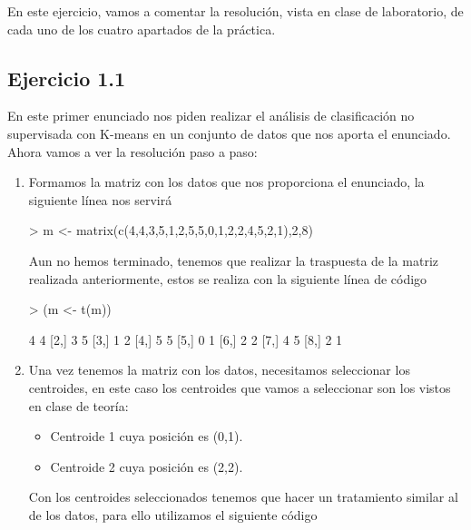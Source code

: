 \documentclass[parskip=full]{scrartcl}
\begin{document}
En este ejercicio, vamos a comentar la resolución, vista en clase de laboratorio, de cada uno de los cuatro apartados de la práctica.

\subsection{Ejercicio 1.1}

En este primer enunciado nos piden realizar el análisis de clasificación no supervisada con K-means en un conjunto de datos que nos aporta el enunciado. Ahora vamos a ver la resolución paso a paso:

\begin{enumerate}
    \item Formamos la matriz con los datos que nos proporciona el enunciado, la siguiente línea nos servirá


\begin{Schunk}
\begin{Sinput}
> m <- matrix(c(4,4,3,5,1,2,5,5,0,1,2,2,4,5,2,1),2,8)
\end{Sinput}
\end{Schunk}


    Aun no hemos terminado, tenemos que realizar la traspuesta de la matriz realizada anteriormente, estos se realiza con la siguiente línea de código


\begin{Schunk}
\begin{Sinput}
> (m <- t(m))
\end{Sinput}
\begin{Soutput}
     [,1] [,2]
[1,]    4    4
[2,]    3    5
[3,]    1    2
[4,]    5    5
[5,]    0    1
[6,]    2    2
[7,]    4    5
[8,]    2    1
\end{Soutput}
\end{Schunk}


    \item Una vez tenemos la matriz con los datos, necesitamos seleccionar los centroides, en este caso los centroides que vamos a seleccionar son los vistos en clase de teoría:

    \begin{itemize}
        \item Centroide 1 cuya posición es (0,1).
        \item Centroide 2 cuya posición es (2,2).
    \end{itemize}

    Con los centroides seleccionados tenemos que hacer un tratamiento similar al de los datos, para ello utilizamos el siguiente código



\end{enumerate}
\end{document}
